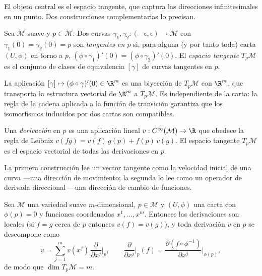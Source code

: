 El objeto central es el espacio tangente, que captura las direcciones
infinitesimales en un punto. Dos construcciones complementarias lo precisan.

\begin{definition}
\label{def:found:tangent-curves}
Sea $\mathcal{M}$ suave y $p \in \mathcal{M}$. Dos curvas $\gamma_1, \gamma_2 :
(-\epsilon,\epsilon) \to \mathcal{M}$ con $\gamma_1(0) = \gamma_2(0) = p$ son
\emph{tangentes en $p$} si, para alguna (y por tanto toda) carta $(U,\phi)$ en
torno a $p$, $(\phi\circ\gamma_1)'(0) = (\phi\circ\gamma_2)'(0)$. El \emph{espacio
tangente} $T_p\mathcal{M}$ es el conjunto de clases de equivalencia $[\gamma]$ de
curvas tangentes en $p$.
\end{definition}

\begin{remark}
\label{rem:found:tangent-vector}
La aplicaci\'on $[\gamma] \mapsto (\phi\circ\gamma)'(0) \in \R^m$ es una biyecci\'on
de $T_p\mathcal{M}$ con $\R^m$, que transporta la estructura vectorial de $\R^m$ a
$T_p\mathcal{M}$. Es independiente de la carta: la regla de la cadena aplicada a la
funci\'on de transici\'on garantiza que los isomorfismos inducidos por dos cartas
son compatibles.
\end{remark}

\begin{definition}
\label{def:found:tangent-deriv}
Una \emph{derivaci\'on} en $p$ es una aplicaci\'on lineal $v : C^\infty(\mathcal{M})
\to \R$ que obedece la regla de Leibniz $v(fg) = v(f)\,g(p) + f(p)\,v(g)$. El
espacio tangente $T_p\mathcal{M}$ es el espacio vectorial de todas las derivaciones
en $p$.
\end{definition}

La primera construcci\'on lee un vector tangente como la velocidad inicial de una
curva ---una direcci\'on de movimiento; la segunda lo lee como un operador de
derivada direccional ---una direcci\'on de cambio de funciones.

\begin{lemma}
\label{lem:found:derivations}
Sea $\mathcal{M}$ una variedad suave $m$-dimensional, $p \in \mathcal{M}$ y
$(U, \phi)$ una carta con $\phi(p) = 0$ y funciones coordenadas $x^1, \ldots, x^m$.
Entonces las derivaciones son locales (si $f = g$ cerca de $p$ entonces $v(f) =
v(g)$), y toda derivaci\'on $v$ en $p$ se descompone como
\[
  v = \sum_{j=1}^m v(x^j)\,\frac{\partial}{\partial x^j}\Big|_p,
  \qquad \frac{\partial}{\partial x^j}\Big|_p(f) =
  \frac{\partial(f\circ\phi^{-1})}{\partial x^j}\Big|_{\phi(p)},
\]
de modo que $\dim T_p\mathcal{M} = m$.
\end{lemma}


